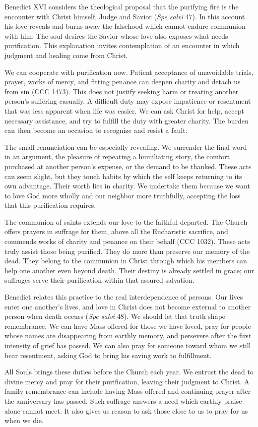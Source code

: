 Benedict XVI considers the theological proposal that the purifying fire is the encounter with Christ himself, Judge and Savior (\emph{Spe salvi} 47). In this account his love reveals and burns away the falsehood which cannot endure communion with him. The soul desires the Savior whose love also exposes what needs purification. This explanation invites contemplation of an encounter in which judgment and healing come from Christ.

We can cooperate with purification now. Patient acceptance of unavoidable trials, prayer, works of mercy, and fitting penance can deepen charity and detach us from sin (CCC 1473). This does not justify seeking harm or treating another person's suffering casually. A difficult duty may expose impatience or resentment that was less apparent when life was easier. We can ask Christ for help, accept necessary assistance, and try to fulfill the duty with greater charity. The burden can then become an occasion to recognize and resist a fault.

The small renunciation can be especially revealing. We surrender the final word in an argument, the pleasure of repeating a humiliating story, the comfort purchased at another person's expense, or the demand to be thanked. These acts can seem slight, but they touch habits by which the self keeps returning to its own advantage. Their worth lies in charity. We undertake them because we want to love God more wholly and our neighbor more truthfully, accepting the loss that this purification requires.

The communion of saints extends our love to the faithful departed. The Church offers prayers in suffrage for them, above all the Eucharistic sacrifice, and commends works of charity and penance on their behalf (CCC 1032). These acts truly assist those being purified. They do more than preserve our memory of the dead. They belong to the communion in Christ through which his members can help one another even beyond death. Their destiny is already settled in grace; our suffrages serve their purification within that assured salvation.

Benedict relates this practice to the real interdependence of persons. Our lives enter one another's lives, and love in Christ does not become external to another person when death occurs (\emph{Spe salvi} 48). We should let that truth shape remembrance. We can have Mass offered for those we have loved, pray for people whose names are disappearing from earthly memory, and persevere after the first intensity of grief has passed. We can also pray for someone toward whom we still bear resentment, asking God to bring his saving work to fulfillment.

All Souls brings these duties before the Church each year. We entrust the dead to divine mercy and pray for their purification, leaving their judgment to Christ. A family remembrance can include having Mass offered and continuing prayer after the anniversary has passed. Such suffrage answers a need which earthly praise alone cannot meet. It also gives us reason to ask those close to us to pray for us when we die.

